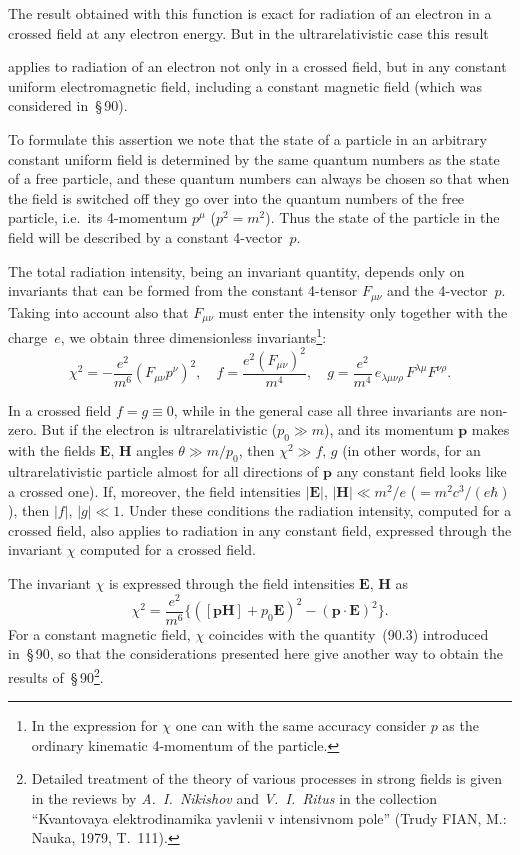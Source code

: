 The result obtained with this function is exact for radiation of an electron in a crossed field at any electron energy. But in the ultrarelativistic case this result


\noindent applies to radiation of an electron not only in a crossed field, but in any constant uniform electromagnetic field, including a constant magnetic field (which was considered in~\S\,90).

To formulate this assertion we note that the state of a particle in an arbitrary constant uniform field is determined by the same quantum numbers as the state of a free particle, and these quantum numbers can always be chosen so that when the field is switched off they go over into the quantum numbers of the free particle, i.e.\ its 4-momentum $p^\mu$ ($p^2 = m^2$). Thus the state of the particle in the field will be described by a constant 4-vector~$p$.

The total radiation intensity, being an invariant quantity, depends only on invariants that can be formed from the constant 4-tensor $F_{\mu\nu}$ and the 4-vector~$p$. Taking into account also that $F_{\mu\nu}$ must enter the intensity only together with the charge~$e$, we obtain three dimensionless invariants\footnote{In the expression for $\chi$ one can with the same accuracy consider $p$ as the ordinary kinematic 4-momentum of the particle.}:
\begin{equation}
\chi^2 = -\frac{e^2}{m^6}(F_{\mu\nu}p^\nu)^2, \quad f = \frac{e^2 (F_{\mu\nu})^2}{m^4}, \quad g = \frac{e^2}{m^4}\,e_{\lambda\mu\nu\rho}\,F^{\lambda\mu}F^{\nu\rho}.
\label{eq:101.21}
\end{equation}

In a crossed field $f = g \equiv 0$, while in the general case all three invariants are non-zero. But if the electron is ultrarelativistic ($p_0 \gg m$), and its momentum $\mathbf{p}$ makes with the fields $\mathbf{E}$, $\mathbf{H}$ angles $\theta \gg m/p_0$, then $\chi^2 \gg f,\,g$ (in other words, for an ultrarelativistic particle almost for all directions of $\mathbf{p}$ any constant field looks like a crossed one). If, moreover, the field intensities $|\mathbf{E}|,\,|\mathbf{H}| \ll m^2/e$ ($= m^2c^3/(e\hbar)$), then $|f|,\,|g| \ll 1$. Under these conditions the radiation intensity, computed for a crossed field, also applies to radiation in any constant field, expressed through the invariant $\chi$ computed for a crossed field.

The invariant $\chi$ is expressed through the field intensities $\mathbf{E}$, $\mathbf{H}$ as
\[
\chi^2 = \frac{e^2}{m^6}\bigl\{([\mathbf{p}\mathbf{H}] + p_0\mathbf{E})^2 - (\mathbf{p}\cdot\mathbf{E})^2\bigr\}.
\]
For a constant magnetic field, $\chi$ coincides with the quantity~(90.3) introduced in~\S\,90, so that the considerations presented here give another way to obtain the results of~\S\,90\footnote{Detailed treatment of the theory of various processes in strong fields is given in the reviews by \emph{A.~I.~Nikishov} and \emph{V.~I.~Ritus} in the collection ``Kvantovaya elektrodinamika yavlenii v intensivnom pole'' (Trudy FIAN, M.: Nauka, 1979, T.~111).}.
